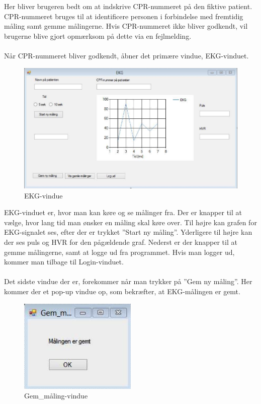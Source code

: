 Her bliver brugeren bedt om at indskrive CPR-nummeret på den fiktive patient. CPR-nummeret bruges til at identificere personen i forbindelse med fremtidig måling samt gemme målingerne. Hvis CPR-nummeret ikke bliver godkendt, vil brugerne blive gjort opmærksom på dette via en fejlmelding. 
\\
\\
Når CPR-nummeret bliver godkendt, åbner det primære vindue, EKG-vinduet. 

\begin{figure}[H]
	\centering
	\includegraphics[width=1\textwidth]{Figurer/Snip20150430_40}
	\caption{EKG-vindue}
\end{figure}

EKG-vinduet er, hvor man kan køre og se målinger fra. Der er knapper til at vælge, hvor lang tid man ønsker en måling skal køre over. Til højre kan grafen for EKG-signalet ses, efter der er trykket ”Start ny måling”. Yderligere til højre kan der ses puls og HVR for den pågældende graf. Nederst er der knapper til at gemme målingerne, samt at logge ud fra programmet. Hvis man logger ud, kommer man tilbage til Login-vinduet. 
\\
\\
Det sidste vindue der er, forekommer når man trykker på ”Gem ny måling”. Her kommer der et pop-up vindue op, som bekræfter, at EKG-målingen er gemt. 

\begin{figure}[H]
	\centering
	\includegraphics[width=0.5\textwidth]{Figurer/Snip20150430_41}
	\caption{Gem\_måling-vindue}
\end{figure}

